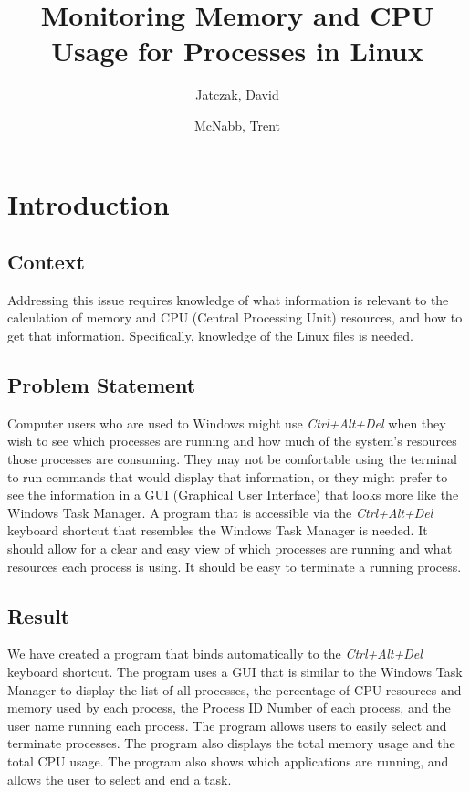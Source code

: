 \documentclass[12pt]{article}
\title{Monitoring Memory and CPU Usage for Processes in Linux}
\author{Jatczak, David \and McNabb, Trent}
\begin{document}
	
	\maketitle
	
	\section{Introduction}
	
	\subsection{Context}
	Addressing this issue requires knowledge of what information is relevant to the calculation of memory and CPU (Central Processing Unit) resources, and how to get that information. Specifically, knowledge of the Linux  files is needed.
	
	\subsection{Problem Statement}
	Computer users who are used to Windows might use \emph{Ctrl+Alt+Del} when they wish to see which processes are running and how much of the system's resources those processes are consuming. They may not be comfortable using the terminal to run commands that would display that information, or they might prefer to see the information in a GUI (Graphical User Interface) that looks more like the Windows Task Manager. A program that is accessible via the \emph{Ctrl+Alt+Del} keyboard shortcut that resembles the Windows Task Manager is needed. It should allow for a clear and easy view of which processes are running and what resources each process is using. It should be easy to terminate a running process.
	
	\subsection{Result}
We have created a program that binds automatically to the \emph{Ctrl+Alt+Del} keyboard shortcut. The program uses a GUI that is similar to the Windows Task Manager to display the list of all processes, the percentage of CPU resources and memory used by each process, the Process ID Number of each process, and the user name running each process. The program allows users to easily select and terminate processes. The program also displays the total memory usage and the total CPU usage. The program also shows which applications are running, and allows the user to select and end a task.
	
\end{document}
